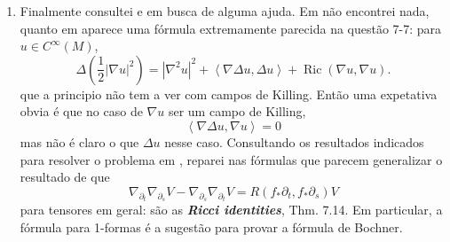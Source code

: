 \begin{enumerate}
\item Finalmente consultei \cite{doc} e \cite{ler} em busca de alguma ajuda. Em \cite{doc} não encontrei nada, quanto em \cite{ler} aparece uma fórmula extremamente parecida na questão 7-7: para \(u \in C^\infty(M)\),
	\[\Delta\left(\frac{1}{2}|\nabla u|^2\right) =|\nabla^2 u|^2+\left<\nabla \Delta u,\Delta u\right>+ \operatorname{Ric}(\nabla u,\nabla u).\]
que a principio não tem a ver com campos de Killing. Então uma expetativa obvia é que no caso de \(\nabla u\) ser um campo de Killing,
\[\left< \nabla \Delta u, \nabla u\right>=0\]
mas não é claro o que \(\Delta u\) nesse caso. Consultando os resultados indicados para resolver o problema em \cite{ler}, reparei nas fórmulas que parecem generalizar o resultado de que
\[\nabla_{\partial_t}\nabla_{\partial_s}V-\nabla_{\partial_s}\nabla_{\partial_t}V=R(f_*\partial_t,f_*\partial_s)V\]
para tensores em geral: são as \textit{\textbf{Ricci identities}}, Thm. 7.14. Em particular, a fórmula para 1-formas é a sugestão para provar a fórmula de Bochner.

\end{enumerate}
\clearpage
